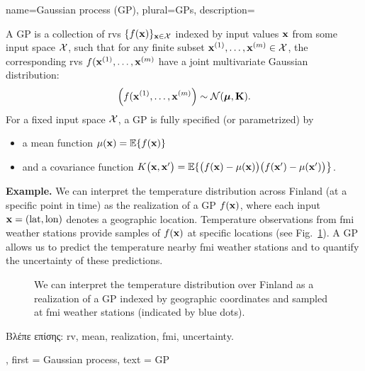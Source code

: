 {name={Gaussian process (GP)}, plural={GPs},
  description={A GP is a collection of \gls{rv}s 
  	$\{f({\bf x})\}_{{\bf x} \in \mathcal{X}}$ indexed by input values ${\bf x}$ 
  	from some input space $\mathcal{X}$, such that for any finite subset 
  	${\bf x}^{(1)}, \ldots, {\bf x}^{(m)} \in \mathcal{X}$, 
  	the corresponding \gls{rv}s $f({\bf x}^{(1)}, \ldots, {\bf x}^{(m)}$ have a joint 
  	multivariate Gaussian distribution:
  	\[
  	\left( f({\bf x}^{(1)}, \ldots, {\bf x}^{(m)} \right) \sim \mathcal{N}(\boldsymbol{\mu}, \mathbf{K}).
  	\]
  	For a fixed input space $\mathcal{X}$, a GP is fully specified (or parametrized) by 
  	\begin{itemize}
  		\item a \gls{mean} function $\mu({\bf x}) = \mathbb{E}\{ f({\bf x})\}$
  		\item and a covariance function $K\big({\bf x},{\bf x}'\big)= \mathbb{E}\{ \big(f({\bf x})-\mu({\bf x})\big) \big(f({\bf x}')-\mu({\bf x}')\big) \big\}$.
  	\end{itemize}
  	\textbf{Example.} We can interpret the temperature distribution across Finland (at a specific 
  	point in time) as the \gls{realization} of a GP $f({\bf x})$, where each input ${\bf x} = (\text{lat}, \text{lon})$ 
  	denotes a geographic location. Temperature observations from \gls{fmi} weather stations provide 
  	samples of $f({\bf x})$ at specific locations (see Fig.\ \ref{fig_gp_FMI}). A GP allows us to 
  	predict the temperature nearby \gls{fmi} weather stations and to quantify the \gls{uncertainty} 
  	of these predictions. 
  	\begin{figure}[H]
  	\begin{center}
\vspace*{-15mm}
\end{center}
\caption{We can interpret the temperature distribution over Finland as a \gls{realization} 
	of a GP indexed by geographic coordinates and sampled at \gls{fmi} weather stations (indicated by 
	blue dots). \label{fig_gp_FMI}}
\end{figure}
\foreignlanguage{greek}{Βλέπε επίσης:} \gls{rv}, \gls{mean}, \gls{realization}, \gls{fmi}, \gls{uncertainty}. }, 
first = {Gaussian process}, 
text = {GP}
}

